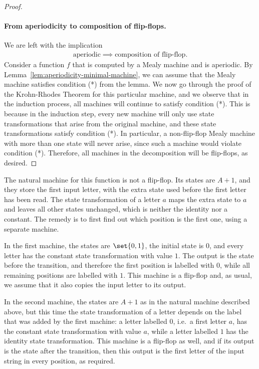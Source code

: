 \begin{proof}
    \paragraph*{From aperiodicity to composition of flip-flops.} We are left with the implication
\begin{align*}\text{aperiodic} \implies \text{composition of flip-flop}.
\end{align*}
Consider a function $f$ that is computed by a Mealy machine and is aperiodic. By Lemma~\ref{lem:aperiodicity-minimal-machine}, we can assume that the Mealy machine satisfies condition (*) from the lemma. We now go through the proof of the Krohn-Rhodes Theorem for this particular machine, and we observe that in the induction process, all machines will continue to satisfy condition (*). This is because in the induction step, every new machine will only use state transformations that arise from the original machine, and these state transformations satisfy condition (*).  In particular, a non-flip-flop Mealy machine with more than one state will never arise, since such a machine would violate condition (*). Therefore, all machines in the decomposition will be flip-flops, as desired.

\end{proof}


\exerciseheader

    {
    The natural machine for this function is not a flip-flop. Its states are $A+1$, and they store the first input letter, with the extra state used before the first letter has been read. The state transformation of a letter $a$ maps the extra state to $a$ and leaves all other states unchanged, which is neither the identity nor a constant. The remedy is to first find out which position is the first one, using a separate machine.

    In the first machine, the states are $\set{0,1}$, the initial state is $0$, and every letter has the constant state transformation with value $1$. The output is the state before the transition, and therefore the first position is labelled with $0$, while all remaining positions are labelled with $1$. This machine is a flip-flop and, as usual, we assume that it also copies the input letter to its output.

    In the second machine, the states are $A+1$ as in the natural machine described above, but this time the state transformation of a letter depends on the label that was added by the first machine: a letter labelled $0$, i.e.~a first letter $a$, has the constant state transformation with value $a$, while a letter labelled $1$ has the identity state transformation. This machine is a flip-flop as well, and if its output is the state after the transition, then this output is the first letter of the input string in every position, as required.
}

